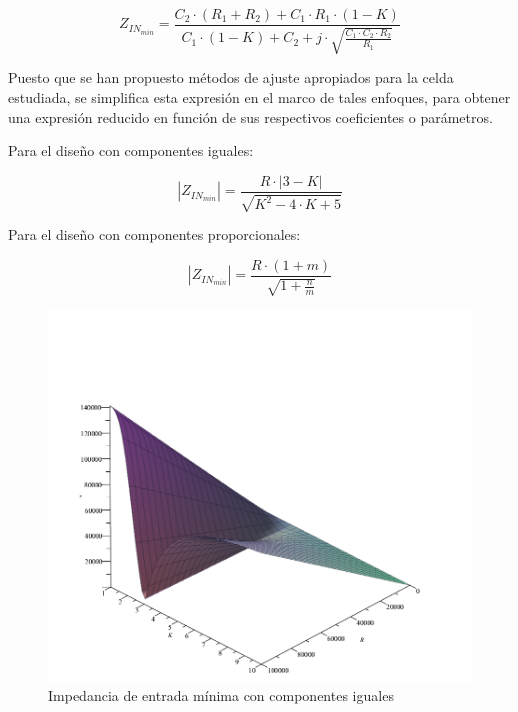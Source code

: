 \begin{equation}
    Z_{IN_{min}} = \frac{C_2 \cdot (R_1 + R_2) + C_1 \cdot R_1 \cdot (1 - K)}{C_1 \cdot (1 - K) + C_2 + j \cdot \sqrt{\frac{C_1 \cdot C_2 \cdot R_2}{R_1}}}
\end{equation}

Puesto que se han propuesto m\'etodos de ajuste apropiados para la celda estudiada, se simplifica esta expresi\'on en el marco de tales enfoques, para obtener una expresi\'on
reducido en funci\'on de sus respectivos coeficientes o par\'ametros.

Para el dise\~no con componentes iguales:

\begin{equation}
    |Z_{IN_{min}}| = \frac{R \cdot |3 - K|}{\sqrt{K^{2} - 4 \cdot K + 5}}
    \label{eq:impedancia_minima_componentes_iguales}
\end{equation}

Para el dise\~no con componentes proporcionales:

\begin{equation}
    |Z_{IN_{min}}| = \frac{R \cdot (1 + m)}{\sqrt{1 + \frac{n}{m}}}
    \label{eq:impedancia_minima_componentes_proporcionales}
\end{equation}

\begin{figure}[H]
    \centering
    \includegraphics[scale=0.45]{../EJ1/Recursos/impedancia_entrada_componentes_iguales.png}
    \caption{Impedancia de entrada m\'inima con componentes iguales}
\end{figure}

